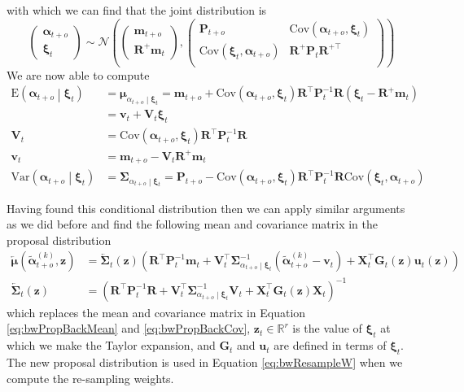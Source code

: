 \documentclass[notitlepage]{article}
\renewcommand{\vec}[1]{\bm{#1}}
\newcommand{\vecLarrow}[1]{\overleftarrow{\vec{#1}}}
\newcommand{\mat}[1]{\mathbf{#1}}
\newcommand{\matLarrow}[1]{\overleftarrow{\mat{#1}}}
\newcommand{\Lparen}[1]{\left( #1\right)}
\newcommand{\Cond}[2]{ #1 \middle\vert  #2}
\newcommand{\VAR}{\text{Var}}
\newcommand{\E}{\text{E}}
\newcommand{\COV}{\text{Cov}}
\newcommand{\optor}[2]{#1\Lparen{#2}}
\newcommand{\optorC}[3]{\optor{#1}{\Cond{#2}{#3}}}
\newcommand{\expecC}[2]{\optorC{\E}{#1}{#2}}
\newcommand{\varpC}[2]{\optorC{\VAR}{#1}{#2}}
\newcommand{\covp}[1]{\optor{\COV}{#1}}
\newcommand\subCond[3]{#1_{\left. #2 \middle\vert #3\right.}}
\newcommand{\normal}[2]{\optor{\mathcal{N}}{#1,#2}}
\newcommand{\particB}[3]{\widetilde{#1}_{#2}^{\Lparen{#3}}}
\newcommand{\dimRng}{r}
\begin{document}
% 
with which we can find that the joint distribution is %
%
$$
\begin{pmatrix}
	\vec \alpha_{t + o} \\ \vec \xi_t
\end{pmatrix} \sim  \normal{%
	\begin{pmatrix} \vec m_{t+o} \\ \mat R^+\vec m_t  \end{pmatrix}}{%
	\begin{pmatrix}
		\mat P_{t + o} & \covp{\vec\alpha_{t + o}, \vec\xi_t} \\
		\covp{\vec\xi_t, \vec\alpha_{t + o}} &  \mat R^+\mat P_t \mat R^{+\top} \\
	\end{pmatrix}
}
$$%
% 
We are now able to compute %
%
\begin{align*}
\expecC{\vec \alpha_{t + o}}{\vec \xi_t} &= 
	\subCond{\vec\mu}{\alpha_{t + o}}{\vec\xi_t}
	= \vec m_{t + o} + \covp{\vec\alpha_{t + o}, \vec\xi_t}
		\mat R^\top\mat P_t^{-1} \mat R\Lparen{\vec\xi_t - \mat R^+\vec m_t} \\
	&= \vec v_t + \mat V_t\vec\xi_t \\
\mat V_t &= \covp{\vec\alpha_{t + o}, \vec\xi_t}\mat R^\top\mat P_t^{-1} \mat R \\
\vec v_t &= \vec m_{t + o} - \mat V_t\mat R^+\vec m_t \\
\varpC{\vec \alpha_{t + o}}{\vec \xi_t} &=
	\subCond{\mat\Sigma}{\alpha_{t + o}}{\vec\xi_t} 
	= \mat P_{t + o} - \covp{\vec\alpha_{t + o}, \vec\xi_t}
		\mat R^\top\mat P_t^{-1} \mat R\covp{\vec\xi_t, \vec\alpha_{t + o}}
\end{align*}

Having found this conditional distribution then we can apply similar arguments as we did 
before and find the following mean and covariance matrix in the proposal distribution %
%
\begin{align*}
\vecLarrow\mu (\particB{\vec{\alpha}}{t + o}k, \vec z)
	&= \matLarrow\Sigma_t(\vec z)\Lparen{
	\mat R^\top\mat P_t^{-1}\vec m_t + 
	\mat V_t^\top\subCond{\mat\Sigma}{\alpha_{t + o}}{\vec\xi_t}^{-1}
	(\particB{\vec{\alpha}}{t + o}k - \vec v_t) + 
	\mat X_t^\top\mat G_t(\vec z)\vec u_t(\vec z)} \\
\matLarrow\Sigma_t(\vec z) &= 
	\Lparen{
		\mat R^\top\mat P_t^{-1} \mat R + 
		\mat V_t^\top\subCond{\mat\Sigma}{\alpha_{t + o}}{\vec\xi_t}^{-1}\mat V_t + 
		\mat X_t^\top \mat G_t(\vec z) \mat X_t}^{-1}
\end{align*} %
%
which replaces the mean and covariance matrix in Equation \eqref{eq:bwPropBackMean} and \eqref{eq:bwPropBackCov},
$\vec z_t\in\mathbb R^\dimRng$ is the value of $\vec\xi_t$ at which we make the Taylor expansion, and
$\mat G_t$ and $\vec u_t$ are defined in terms of $\vec\xi_t$. The new proposal distribution 
is used in Equation \eqref{eq:bwResampleW} when we compute the re-sampling weights. 
\end{document}
